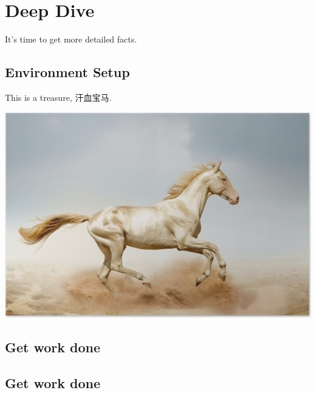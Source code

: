 

\chapter{Deep Dive}

It's time to get more detailed facts.

\section{Environment Setup}

This is a treasure, 汗血宝马.

\includegraphics[scale=3]{chapter2/akhal_teke_horse}

\blindtext[3]

\section{Get work done}

\blindtext[3]

\section{Get work done}

\blindtext[3]
